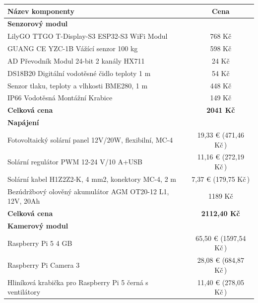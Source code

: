 \begin{table}[H]
    \centering
    \begin{tabular}{|m{}|c|}
    \hline
    \textbf{Název komponenty} & \textbf{Cena} \\
    \hline
    \hline
    \multicolumn{2}{|l|}{\textbf{Senzorový modul}} \\
    \hline
    LilyGO TTGO T-Display-S3 ESP32-S3 WiFi Modul\,\footnotemark[1] & 768 Kč \\
    \hline
    GUANG CE YZC-1B Vážící senzor 100 kg\,\footnotemark[1] & 598 Kč\\
    \hline
    AD Převodník Modul 24-bit 2 kanály HX711\,\footnotemark[1] & 24 Kč \\
    \hline
    DS18B20 Digitální vodotěsné čidlo teploty 1 m\,\footnotemark[1] & 54 Kč \\
    \hline
    Senzor tlaku, teploty a vlhkosti BME280, 1 m\,\footnotemark[1] & 448 Kč \\
    \hline
    IP66 Vodotěsná Montážní Krabice\,\footnotemark[2] & 149 Kč \\
    \hline
    \textbf{Celková cena} & \textbf{2041 Kč} \\
    \hline
    \hline
    \multicolumn{2}{|l|}{\textbf{Napájení}} \\
    \hline
    Fotovoltaický solární panel 12V/20W, flexibilní, MC-4\,\footnotemark[3] & 19,33 € (471,46 Kč\,\footnotemark[4]) \\
    \hline
    Solární regulátor PWM 12-24 V/10 A+USB\,\footnotemark[3] & 11,16 € (272,19 Kč\,\footnotemark[4]) \\
    \hline
    Solární kabel H1Z2Z2-K, 4 mm2, konektory MC-4, 2 m\,\footnotemark[3] & 7,37 € (179,75 Kč\,\footnotemark[4]) \\
    \hline
    Bezúdržbový olověný akumulátor AGM OT20-12 L1, 12V, 20Ah\,\footnotemark[5] & 1189 Kč \\
    \hline
    \textbf{Celková cena} & \textbf{2112,40 Kč} \\
    \hline
    \hline
    \multicolumn{2}{|l|}{\textbf{Kamerový modul}} \\
    \hline
    Raspberry Pi 5 4 GB\,\footnotemark[6] & 65,50 € (1597,54 Kč\,\footnotemark[4]) \\
    \hline
    Raspberry Pi  Camera 3\,\footnotemark[7] & 28,08 € (684,87 Kč\,\footnotemark[4]) \\
    \hline
    Hliníková krabička pro Raspberry Pi 5 černá s ventilátory\,\footnotemark[6] & 11,40 € (278,05 Kč\,\footnotemark[4]) \\

\end{tabular}
\end{table}

